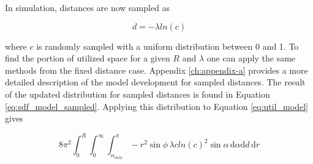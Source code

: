 In simulation, distances are now sampled as

\begin{equation}
  d = -\lambda ln(c)
\end{equation}

where $c$ is randomly sampled with a uniform distribution between 0 and 1. To
find the portion of utilized space for a given $R$ and $\lambda$ one can apply
the same methods from the fixed distance case.  Appendix \ref{ch:appendix-a}
provides a more detailed description of the model development for sampled
distances. The result of the updated distribution for sampled distances is found
in Equation \ref{eq:sdf_model_sampled}. Applying this distribution to Equation
\ref{eq:util_model} gives

\begin{equation}
  8\pi^{2} \int_{0}^{R}\int_{0}^{\infty}\int_{\alpha_{min}}^{\pi}
-r^2\sin{\phi} \, \lambda c ln(c)^2 \sin{\alpha} \, \mathrm{d}\alpha \mathrm{d}d
\, \mathrm{d}r
\end{equation}








